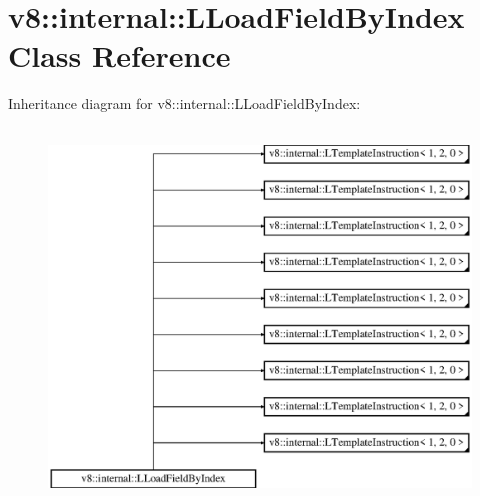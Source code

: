 \hypertarget{classv8_1_1internal_1_1_l_load_field_by_index}{}\section{v8\+:\+:internal\+:\+:L\+Load\+Field\+By\+Index Class Reference}
\label{classv8_1_1internal_1_1_l_load_field_by_index}
Inheritance diagram for v8\+:\+:internal\+:\+:L\+Load\+Field\+By\+Index\+:\begin{figure}[H]
\begin{center}
\leavevmode
\includegraphics[height=10.000000cm]{classv8_1_1internal_1_1_l_load_field_by_index}
\end{center}
\end{figure}
